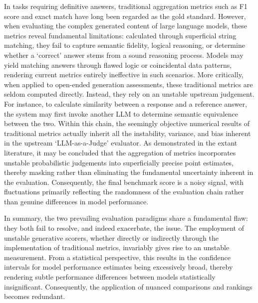 In tasks requiring definitive answers, traditional aggregation metrics such as F1 score and exact match have long been regarded as the gold standard\cite{hu2024unveiling}\cite{wu2024detectrl}. However, when evaluating the complex generated content of large language models, these metrics reveal fundamental limitations: calculated through superficial string matching, they fail to capture semantic fidelity, logical reasoning, or determine whether a ‘correct’ answer stems from a sound reasoning process\cite{white2024livebench}\cite{qiu2024efficient}. Models may yield matching answers through flawed logic or coincidental data patterns, rendering current metrics entirely ineffective in such scenarios\cite{huang2023large}\cite{zeng2023evaluating}.
More critically, when applied to open-ended generation assessments, these traditional metrics are seldom computed directly\cite{cheng2025survey}. Instead, they rely on an unstable upstream judgement\cite{xu2024benchmark}. For instance, to calculate similarity between a response and a reference answer, the system may first invoke another LLM to determine semantic equivalence between the two. Within this chain, the seemingly objective numerical results of traditional metrics actually inherit all the instability, variance, and bias inherent in the upstream ‘LLM-as-a-Judge’ evaluator\cite{li2024llms}\cite{lee2025evaluating}. As demonstrated in the extant literature, it may be concluded that the aggregation of metrics incorporates unstable probabilistic judgements into superficially precise point estimates, thereby masking rather than eliminating the fundamental uncertainty inherent in the evaluation. Consequently, the final benchmark score is a noisy signal, with fluctuations primarily reflecting the randomness of the evaluation chain rather than genuine differences in model performance.

In summary, the two prevailing evaluation paradigms share a fundamental flaw: they both fail to resolve, and indeed exacerbate, the issue. The employment of unstable generative scorers, whether directly or indirectly through the implementation of traditional metrics, invariably gives rise to an unstable measurement. From a statistical perspective, this results in the confidence intervals for model performance estimates being excessively broad, thereby rendering subtle performance differences between models statistically insignificant. Consequently, the application of nuanced comparisons and rankings becomes redundant.


